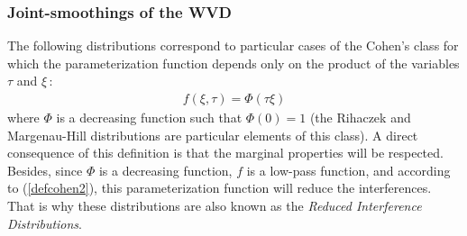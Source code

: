 \subsubsection{Joint-smoothings of the WVD}

  The following distributions correspond to particular cases of the Cohen's
class for which the parameterization function depends only on the product of
the variables $\tau$ and $\xi$\,:
\begin{eqnarray}
\label{paramfun}
f(\xi,\tau)=\Phi(\tau\xi)	       
\end{eqnarray}
where $\Phi$ is a decreasing function such that $\Phi(0)=1$ (the Rihaczek
and Margenau-Hill distributions are particular elements of this class). A
direct consequence of this definition is that the marginal properties will
be respected. Besides, since $\Phi$ is a decreasing function, $f$ is a
low-pass function, and according to (\ref{defcohen2}), this parameterization
function will reduce the interferences. That is why these distributions are
also known as the {\it Reduced Interference Distributions}.
\label{RID}
